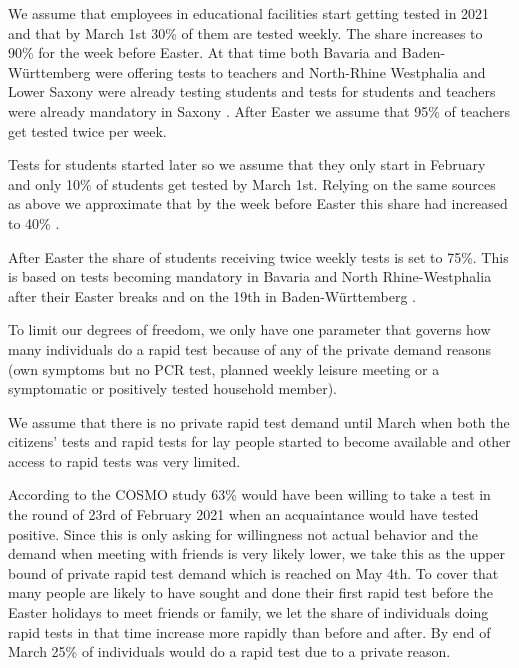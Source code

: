 
We assume that employees in educational facilities start getting tested in 2021 and that
by March 1st 30\% of them are tested weekly. The share increases to 90\% for the week
before Easter. At that time both Bavaria \citep{STMGP2021} and Baden-Württemberg
\citep{MinisteriumKultus2021} were offering tests to teachers and North-Rhine Westphalia
\citep{SchulministeriumNRW2021} and Lower Saxony \citep{NSMK2021} were already testing
students and tests for students and teachers were already mandatory in Saxony
\citep{SMK2021}. After Easter we assume that 95\% of teachers get tested twice per week.

Tests for students started later \citep{MinisteriumKultus2021, SchulministeriumNRW2021}
so we assume that they only start in February and only 10\% of students get tested by
March 1st. Relying on the same sources as above we approximate that by the week before
Easter this share had increased to 40\% \citep{SchulministeriumNRW2021}.

After Easter the share of students receiving twice weekly tests is set to 75\%. This is
based on tests becoming mandatory in Bavaria \citep{BayerischeStaatskanzlei2021} and
North Rhine-Westphalia \citep{SchulministeriumNRW2021b} after their Easter breaks and
on the 19th in Baden-Württemberg \citep{KMBaWue2021}.


To limit our degrees of freedom, we only have one parameter that governs how many
individuals do a rapid test because of any of the private demand reasons (own symptoms
but no PCR test, planned weekly leisure meeting or a symptomatic or positively tested
household member).

We assume that there is no private rapid test demand until March when both the citizens'
tests and rapid tests for lay people started to become available
\citep{Bundesanzeiger2021a, Bundesregierung2021} and other access to rapid tests was very
limited.

According to the COSMO study \citep{Betsch2021a} 63\% would have been willing to take a
test in the round of 23rd of February 2021 when an acquaintance would have tested
positive. Since this is only asking for willingness not actual behavior and the demand
when meeting with friends is very likely lower, we take this as the upper bound of
private rapid test demand which is reached on May 4th. To cover that many people are
likely to have sought and done their first rapid test before the Easter holidays to meet
friends or family, we let the share of individuals doing rapid tests in that time
increase more rapidly than before and after. By end of March 25\% of individuals would do
a rapid test due to a private reason.

